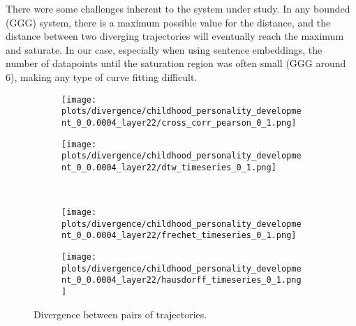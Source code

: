 \documentclass[a4paper,12pt]{article}
\begin{document}
There were some challenges inherent to the system under study. In any bounded (GGG) system, there is a maximum possible value for the distance, and the distance between two diverging trajectories will eventually reach the maximum and saturate. In our case, especially when using sentence embeddings, the number of datapoints until the saturation region was often small (GGG around 6), making any type of curve fitting difficult.

\begin{figure}[H]
    \centering
    \begin{subfigure}[b]{0.48\textwidth}
        \centering
        \texttt{[image: plots/divergence/childhood\_personality\_development\_0\_0.0004\_layer22/cross\_corr\_pearson\_0\_1.png]}
    \end{subfigure}\hfill
    \begin{subfigure}[b]{0.48\textwidth}
        \centering
        \texttt{[image: plots/divergence/childhood\_personality\_development\_0\_0.0004\_layer22/dtw\_timeseries\_0\_1.png]}
    \end{subfigure}
    \\[0.5em]
    \begin{subfigure}[b]{0.48\textwidth}
        \centering
        \texttt{[image: plots/divergence/childhood\_personality\_development\_0\_0.0004\_layer22/frechet\_timeseries\_0\_1.png]}
    \end{subfigure}\hfill
    \begin{subfigure}[b]{0.48\textwidth}
        \centering
        \texttt{[image: plots/divergence/childhood\_personality\_development\_0\_0.0004\_layer22/hausdorff\_timeseries\_0\_1.png]}
    \end{subfigure}
    \caption{Divergence between pairs of trajectories.}
    \label{fig:distance_hidden}
\end{figure}
\end{document}
